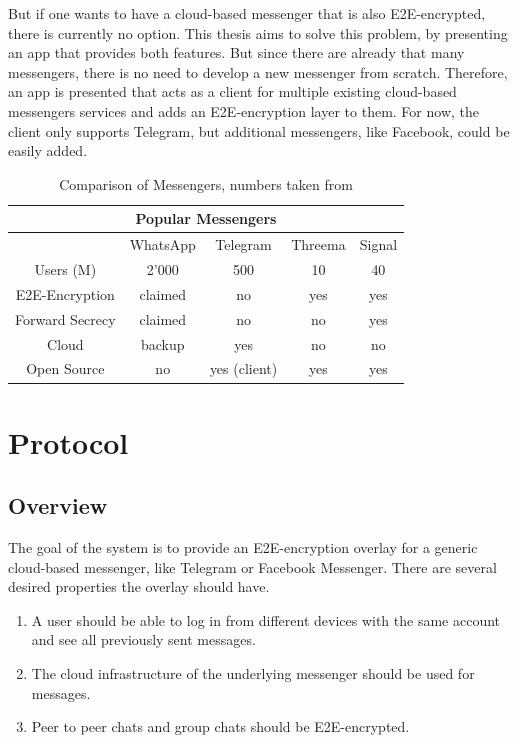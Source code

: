 \documentclass[a4paper, oneside]{discothesis}
\begin{document}
But if one wants to have a cloud-based messenger that is also E2E-encrypted, there is currently no option. This thesis aims to solve this problem, by presenting an app that provides both features. But since there are already that many messengers, there is no need to develop a new messenger from scratch. Therefore, an app is presented that acts as a client for multiple existing cloud-based messengers services and adds an E2E-encryption layer to them. For now, the client only supports Telegram, but additional messengers, like Facebook, could be easily added.


\begin{table}[h!]
\centering
\begin{center}
 \begin{tabular}{|| c ||c c c c||} 
  \hline
 \multicolumn{5}{|c|}{Popular Messengers} \\
 \hline
 \hline
   & WhatsApp & Telegram & Threema & Signal \\ [0.5ex] 
 \hline\hline
 Users (M) & 2'000 & 500 & 10 & 40 \\ 
 \hline
 E2E-Encryption & claimed\footnotemark & no & yes & yes \\
 \hline
 Forward Secrecy & claimed\footnotemark[\value{footnote}] & no & no & yes \\
 \hline
 Cloud & backup & yes & no & no \\
 \hline
 Open Source & no & yes (client) & yes & yes \\
 \hline
\end{tabular}
\end{center}
\caption{Comparison of Messengers, numbers taken from \cite{Business, Statistia}}
\label{table:messengers}
\end{table}


\chapter{Protocol}

\section{Overview}
The goal of the system is to provide an E2E-encryption overlay for a generic cloud-based messenger, like Telegram or Facebook Messenger. There are several desired properties the overlay should have.

\begin{enumerate}
  \item A user should be able to log in from different devices with the same account and see all previously sent messages. 
  \item The cloud infrastructure of the underlying messenger should be used for messages.
  \item Peer to peer chats and group chats should be E2E-encrypted.
\end{enumerate}
\end{document}
